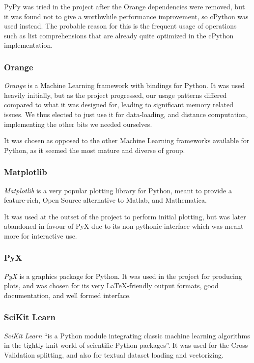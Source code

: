 \documentclass[a4paper,11pt]{report}
\begin{document}
PyPy was tried in the project after the Orange dependencies were removed, but it was found not to give a worthwhile performance improvement, so cPython was used instead. The probable reason for this is the frequent usage of operations such as list comprehensions that are already quite optimized in the cPython implementation.

\subsubsection*{Orange}
\emph{Orange} \citep{prog:orange} is a Machine Learning framework with bindings for Python. It was used heavily initially, but as the project progressed, our usage patterns differed compared to what it was designed for, leading to significant memory related issues. We thus elected to just use it for data-loading, and distance computation, implementing the other bits we needed ourselves.

It was chosen as opposed to the other Machine Learning frameworks available for Python, as it seemed the most mature and diverse of group.

\subsubsection*{Matplotlib}
\emph{Matplotlib} \citep{prog:matplotlib} is a very popular plotting library for Python, meant to provide a feature-rich, Open Source alternative to Matlab, and Mathematica.

It was used at the outset of the project to perform initial plotting, but was later abandoned in favour of PyX due to its non-pythonic interface which was meant more for interactive use.

\subsubsection*{PyX}
\emph{PyX} \citep{prog:pyx} is a graphics package for Python. It was used in the project for producing plots, and was chosen for its very \LaTeX{}-friendly output formats, good documentation, and well formed interface.

\subsubsection*{SciKit Learn}
\emph{SciKit Learn} \citep{prog:sklearn} ``is a Python module integrating classic machine learning algorithms in the tightly-knit world of scientific Python packages''. It was used for the Cross Validation splitting, and also for textual dataset loading and vectorizing.
\end{document}
